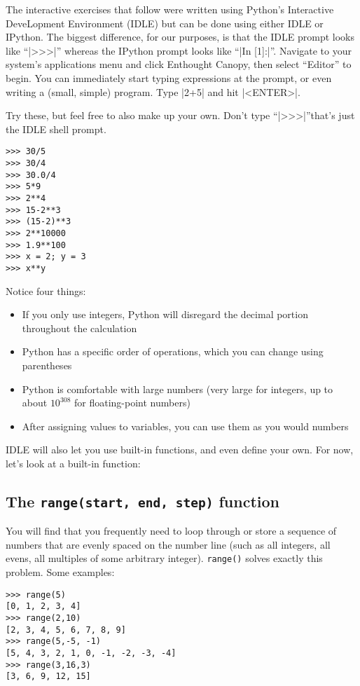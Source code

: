 \documentclass{article}
\begin{document}
The interactive exercises that follow were written using Python's Interactive DeveLopment Environment (IDLE) but can be done using either IDLE or IPython.  The biggest difference, for our purposes, is that the IDLE prompt looks like ``|>>>|'' whereas the IPython prompt looks like ``|In [1]:|''. Navigate to your system's applications menu and click Enthought Canopy, then select ``Editor'' to begin.  You can immediately start typing expressions at the prompt, or even writing a (small, simple)
program.  Type |2+5| and hit |<ENTER>|.

\pagebreak
Try these, but feel free to also make up your own.  Don't type
``|>>>|''\textemdash that's just the IDLE shell prompt.
\begin{Verbatim}
>>> 30/5
>>> 30/4
>>> 30.0/4
>>> 5*9
>>> 2**4
>>> 15-2**3
>>> (15-2)**3
>>> 2**10000
>>> 1.9**100
>>> x = 2; y = 3
>>> x**y
\end{Verbatim}

Notice four things:
\begin{itemize}
 \item If you only use integers, Python will disregard the decimal portion throughout the calculation
 \item Python has a specific order of operations, which you can change using parentheses
 \item Python is comfortable with large numbers (very large for integers, up to
about $10^{308}$ for floating-point numbers)
 \item After assigning values to variables, you can use them as you would numbers
\end{itemize}

IDLE will also let you use built-in functions, and even define your own.  For
now, let's look at a built-in function:

\subsection{The \texttt{range(start, end, step)} function}
You will find that you frequently need to loop through or store a sequence
of numbers that are evenly spaced on the number line (such as all integers, all
evens, all multiples of some arbitrary integer).  \texttt{range()} solves exactly this problem.  Some examples:

\begin{Verbatim}
>>> range(5)
[0, 1, 2, 3, 4]
>>> range(2,10)
[2, 3, 4, 5, 6, 7, 8, 9]
>>> range(5,-5, -1)
[5, 4, 3, 2, 1, 0, -1, -2, -3, -4]
>>> range(3,16,3)
[3, 6, 9, 12, 15]
\end{Verbatim}
\end{document}
